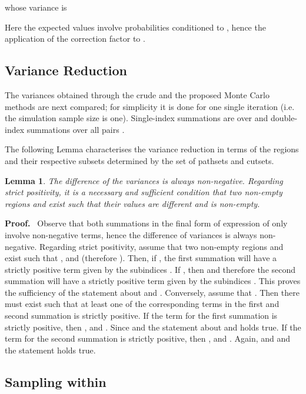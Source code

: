 \documentclass[a4paper]{article}
\newtheorem{lemma}{Lemma}
\newcommand{\bproof}{\textbf{Proof.}~}
\newcommand{\eproof}{\\}
\begin{document}
whose variance is



Here the expected values involve probabilities conditioned to , hence the application of the correction factor  to .

\subsection{Variance Reduction}

The variances obtained through the crude and the proposed Monte Carlo methods are next compared; for simplicity it is done for one single iteration (i.e. the simulation sample size is one). Single-index summations are over  and double-index summations over all pairs .



The following Lemma characterises the variance reduction in terms of the regions and their respective subsets determined by the set of pathsets and cutsets.

\begin{lemma} The difference of the variances  is always non-negative. Regarding strict positivity, it is a necessary and sufficient condition that two non-empty regions  and  exist such that their  values are different and  is non-empty.
\end{lemma} \label{lem:varred}
\bproof
Observe that both summations in the final form of expression of  only involve non-negative terms, hence the difference of variances is always non-negative. Regarding strict positivity, assume that two non-empty regions  and  exist such that ,  and  (therefore ). Then, if , the first summation will have a strictly positive term given by the subindices . If , then  and therefore the second summation will have a strictly positive term given by the  subindices . This proves the sufficiency of the statement about  and . Conversely, assume that . Then there must exist  such that at least one of the corresponding terms in the first and second summation is strictly positive. If the term for the first summation is strictly positive, then ,  and . Since  and  the statement about  and  holds true. If the term for the second summation is strictly positive, then ,  and . Again,  and  and the statement holds true.
\eproof


\subsection{Sampling within } \label{ss:sampling}
\end{document}
